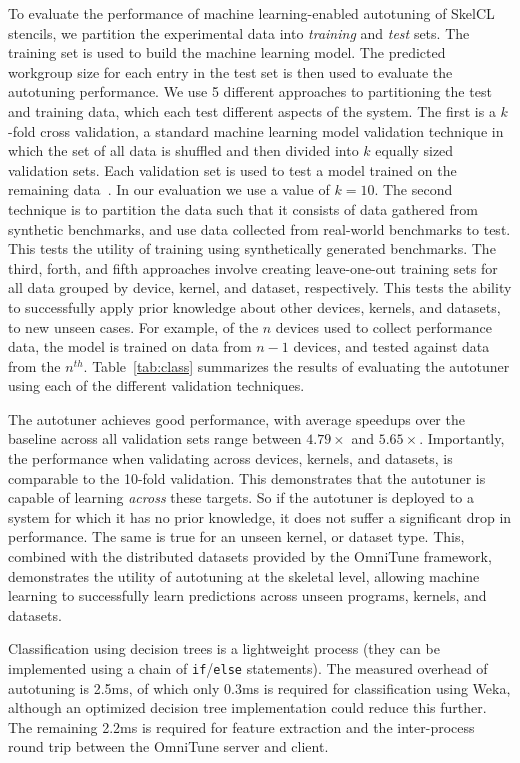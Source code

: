 \documentclass[nonatbib,preprint,nocopyrightspace,9pt]{sigplanconf}
\begin{document}
To evaluate the performance of machine learning-enabled autotuning of
SkelCL stencils, we partition the experimental data into
\emph{training} and \emph{test} sets. The training set is used to
build the machine learning model. The predicted workgroup size for
each entry in the test set is then used to evaluate the autotuning
performance. We use 5 different approaches to partitioning the test
and training data, which each test different aspects of the
system. The first is a $k$-fold cross validation, a standard machine
learning model validation technique in which the set of all data is
shuffled and then divided into $k$ equally sized validation sets. Each
validation set is used to test a model trained on the remaining
data~\cite{Han2011}. In our evaluation we use a value of $k=10$. The
second technique is to partition the data such that it consists of
data gathered from synthetic benchmarks, and use data collected from
real-world benchmarks to test. This tests the utility of training
using synthetically generated benchmarks. The third, forth, and fifth
approaches involve creating leave-one-out training sets for all data
grouped by device, kernel, and dataset, respectively. This tests the
ability to successfully apply prior knowledge about other devices,
kernels, and datasets, to new unseen cases. For example, of the $n$
devices used to collect performance data, the model is trained on data
from $n-1$ devices, and tested against data from the
$n^{th}$. Table~\ref{tab:class} summarizes the results of evaluating
the autotuner using each of the different validation techniques.

The autotuner achieves good performance, with average speedups over
the baseline across all validation sets range between $4.79\times$ and
$5.65\times$. Importantly, the performance when validating across
devices, kernels, and datasets, is comparable to the 10-fold
validation. This demonstrates that the autotuner is capable of
learning \emph{across} these targets. So if the autotuner is deployed
to a system for which it has no prior knowledge, it does not suffer a
significant drop in performance. The same is true for an unseen
kernel, or dataset type. This, combined with the distributed datasets
provided by the OmniTune framework, demonstrates the utility of
autotuning at the skeletal level, allowing machine learning to
successfully learn predictions across unseen programs, kernels, and
datasets.

Classification using decision trees is a lightweight process (they can
be implemented using a chain of \texttt{if}/\texttt{else} statements).
The measured overhead of autotuning is 2.5ms, of which only 0.3ms is
required for classification using Weka, although an optimized decision
tree implementation could reduce this further. The remaining 2.2ms is
required for feature extraction and the inter-process round trip
between the OmniTune server and client.
\end{document}
